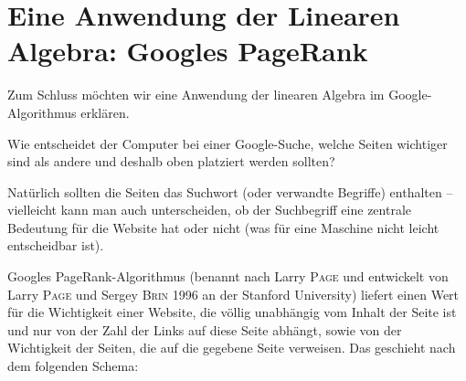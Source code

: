 \section{Eine Anwendung der Linearen Algebra: Googles PageRank}
\label{sec:2.13}
Zum Schluss möchten wir eine Anwendung der linearen Algebra im Google-Algorithmus  erklären.

Wie entscheidet der Computer bei einer Google-Suche, welche Seiten wichtiger sind als andere und deshalb oben platziert werden sollten?

Natürlich sollten die Seiten das Suchwort (oder verwandte Begriffe) enthalten -- vielleicht kann man auch unterscheiden, ob der Suchbegriff eine zentrale Bedeutung für die Website hat oder nicht (was für eine Maschine nicht leicht entscheidbar ist).

Googles PageRank-Algorithmus (benannt nach Larry \textsc{Page} und entwickelt von Larry \textsc{Page} und Sergey \textsc{Brin} 1996 an der Stanford University) liefert einen Wert für die Wichtigkeit einer Website, die völlig unabhängig vom Inhalt der Seite ist und nur von der Zahl der Links auf diese Seite abhängt, sowie von der Wichtigkeit der Seiten, die auf die gegebene Seite verweisen.
Das geschieht nach dem folgenden Schema:

